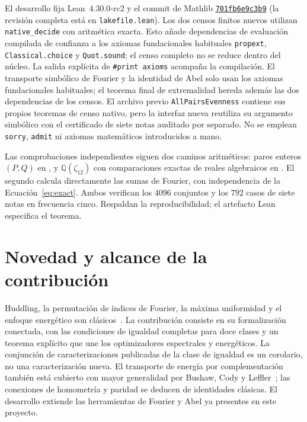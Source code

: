 \documentclass[11pt]{article}
\newcommand{\lean}[1]{\texttt{#1}}
\begin{document}
El desarrollo fija Lean~4.30.0-rc2 y el commit de Mathlib
\href{https://github.com/leanprover-community/mathlib4/tree/701fb6e9c3b9285968b375d19886bfc5ca134840}{\lean{701fb6e9c3b9}}
(la revisión completa está en \lean{lakefile.lean}).
Los dos censos finitos nuevos utilizan \lean{native\_decide} con aritmética exacta.
Esto añade dependencias de evaluación compilada de confianza a los axiomas fundacionales
habituales \lean{propext}, \lean{Classical.choice} y \lean{Quot.sound}; el censo completo
no se reduce dentro del núcleo. La salida explícita de \lean{\#print axioms} acompaña
la compilación. El transporte simbólico de Fourier y la identidad de Abel solo usan
los axiomas fundacionales habituales; el teorema final de extremalidad hereda además
las dos dependencias de los censos. El archivo previo \lean{AllPairsEvenness} contiene
sus propios teoremas de censo nativo, pero la interfaz nueva reutiliza su argumento
simbólico con el certificado de siete notas auditado por separado. No se emplean
\lean{sorry}, \lean{admit} ni axiomas matemáticos introducidos a mano.

Las comprobaciones independientes siguen dos caminos aritméticos: pares enteros $(P,Q)$
en , y $\mathbb Q(\zeta_{12})$ con comparaciones exactas de
reales algebraicos en . El segundo calcula directamente
las sumas de Fourier, con independencia de la Ecuación~\eqref{eq:exact}. Ambos verifican
los $4096$ conjuntos y los $792$ casos de siete notas en frecuencia cinco. Respaldan la
reproducibilidad; el artefacto Lean especifica el teorema.

\section{Novedad y alcance de la contribución}\label{sec:novelty}

Huddling, la permutación de índices de Fourier, la máxima uniformidad y el enfoque
energético son clásicos~\cite{Amiot2007,Amiot2009,CloughDouthett,DK}. La contribución
consiste en su formalización conectada, con las condiciones de igualdad completas para
doce clases y un teorema explícito que une los optimizadores espectrales y energéticos.
La conjunción de caracterizaciones publicadas de la clase de igualdad es un corolario,
no una caracterización nueva. El transporte de energía por complementación también
está cubierto con mayor generalidad por Bushaw, Cody y Leffler~\cite[Teoremas~2.16 y~3.5]{BCL};
las conexiones de homometría y paridad se deducen de identidades clásicas. El desarrollo
extiende las herramientas de Fourier y Abel ya presentes en este proyecto.
\end{document}
